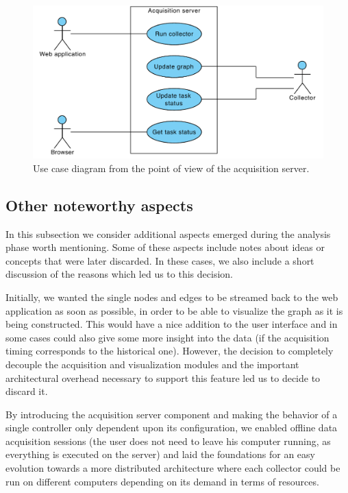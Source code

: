 \begin{figure}[p]
  \centering
  \includegraphics[width=0.75\linewidth]{images/uc-server}
  \caption[Use case diagram for the acquisition server.]{Use case diagram from the point of view of the acquisition server.}
  \label{fig:uc-server}
\end{figure}

\subsection{Other noteworthy aspects}

In this subsection we consider additional aspects emerged during the analysis phase worth mentioning. Some of these aspects include notes about ideas or concepts that were later discarded. In these cases, we also include a short discussion of the reasons which led us to this decision.

Initially, we wanted the single nodes and edges to be streamed back to the web application as soon as possible, in order to be able to visualize the graph as it is being constructed. This would have a nice addition to the user interface and in some cases could also give some more insight into the data (if the acquisition timing corresponds to the historical one). However, the decision to completely decouple the acquisition and visualization modules and the important architectural overhead necessary to support this feature led us to decide to discard it.

By introducing the acquisition server component and making the behavior of a single controller only dependent upon its configuration, we enabled offline data acquisition sessions (the user does not need to leave his computer running, as everything is executed on the server) and laid the foundations for an easy evolution towards a more distributed architecture where each collector could be run on different computers depending on its demand in terms of resources.



